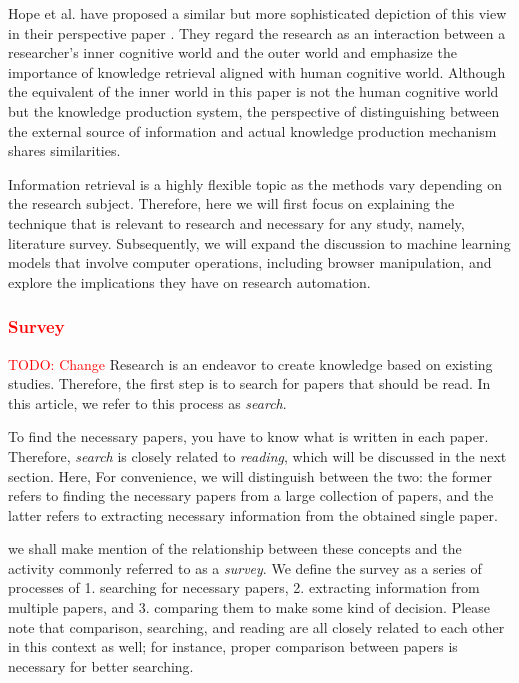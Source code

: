 \documentclass{book}
\begin{document}
Hope et al. have proposed a similar but more sophisticated depiction of this view in their perspective paper \cite{hope2022computational}. They regard the research as an interaction between a researcher’s inner cognitive world and the outer world and emphasize the importance of knowledge retrieval aligned with human cognitive world. Although the equivalent of the inner world in this paper is not the human cognitive world but the knowledge production system, the perspective of distinguishing between the external source of information and actual knowledge production mechanism shares similarities.

Information retrieval is a highly flexible topic as the methods vary depending on the research subject. Therefore, here we will first focus on explaining the technique that is relevant to research and necessary for any study, namely, literature survey. Subsequently, we will expand the discussion to machine learning models that involve computer operations, including browser manipulation, and explore the implications they have on research automation.

\subsubsection{\textcolor{red}{Survey}}
\textcolor{red}{TODO: Change}
Research is an endeavor to create knowledge based on existing studies. Therefore, the first step is to search for papers that should be read. In this article, we refer to this process as \textit{search}.

To find the necessary papers, you have to know what is written in each paper. Therefore, \textit{search} is closely related to \textit{reading}, which will be discussed in the next section. Here, For convenience, we will distinguish between the two: the former refers to finding the necessary papers from a large collection of papers, and the latter refers to extracting necessary information from the obtained single paper.

we shall make mention of the relationship between these concepts and the activity commonly referred to as a \textit{survey}. We define the survey as a series of processes of 1. searching for necessary papers, 2. extracting information from multiple papers, and 3. comparing them to make some kind of decision. Please note that comparison, searching, and reading are all closely related to each other in this context as well; for instance, proper comparison between papers is necessary for better searching.
\end{document}
